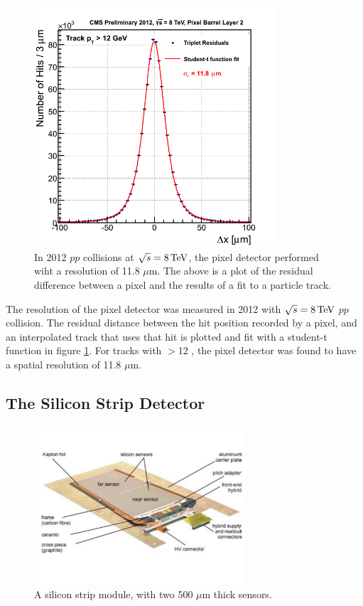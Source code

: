 \begin{figure}[h]
   \centering
  \includegraphics[width=0.8\textwidth]{Figures/CMS_Diagrams/Tracker__Pixel_Resolution__2012_data.png}
  \caption{In 2012 $pp$ collisions at $\sqrt{s}=8 \,\text{Te\hspace{-.08em}V}$, the pixel
    detector performed wiht a resolution of 11.8 $\mu$m.  The above
    is a plot of the residual difference between a pixel and the
    results of a fit to a particle track.} \label{fig:tracker_pixel_resolution}
\end{figure}

\par The resolution of the pixel detector was measured in 2012 with
$\sqrt{s}=8 \,\text{Te\hspace{-.08em}V}$ $pp$ collision.  The residual distance between the
hit position recorded by a pixel, and an interpolated track that uses
that hit is plotted and fit with a student-t function in figure
\ref{fig:tracker_pixel_resolution}.  For tracks with \PT$>$12 \GeV, the
pixel detector was found to have a spatial resolution of 11.8 $\mu$m. 


\subsection{The Silicon Strip Detector}
\label{tracker_strip_description}

\begin{figure}[h]
   \centering
  \includegraphics[width=0.7\textwidth]{Figures/CMS_Diagrams/Tracker__Silicon_Strip_Module.pdf}
  \caption{A silicon strip module, with two 500 $\mu$m thick sensors.} \label{fig:tracker_strip_module}
\end{figure}

